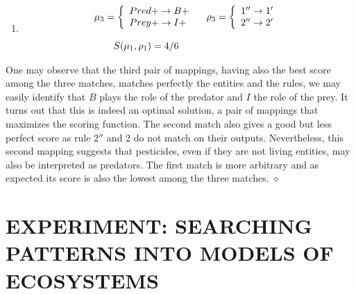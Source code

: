 \documentclass[a4paper,twoside]{article}
\begin{document}
\begin{example}
\begin{enumerate}
\item $$\begin{array}{l@{\hspace{3mm}}l@{\hspace{3mm}}}
	\mapcomp_3=\left\{
		\begin{array}{l}
					Pred+ \to B+ \\
                    Prey+ \to I+ \\
				\end{array}\right.
                    &
     ~\maprule_3=\left\{
                \begin{array}{l}
                   1'' \to 1' \\
				   2'' \to 2' \\
					\end{array}\right. 
                    \\ \\
   \qquad                 \gf(\mapcomp_1,\maprule_1)=4/6
\end{array}$$
%

\end{enumerate}

One may observe that the third pair of mappings, having also the best score among the three matches, matches perfectly the entities and the rules, \ie we may easily identify that $B$ plays the role of the predator and $I$ the role of the prey.
It turns out that this is indeed an optimal solution, \ie a pair of mappings that maximizes the scoring function.
%
The second match also gives a good but less perfect score as
rule $2''$ and $2$ do not match on their outputs. Nevertheless, this second mapping suggests that pesticides, even if they are not living entities, may also be interpreted as predators. 
%
%
The first match is more arbitrary and as expected its score is also the lowest among the three matches.
\hfill $\diamond$
\end{example}




\section{\uppercase{Experiment: searching patterns into models of ecosystems}}
\label{sec:experiments}
\end{document}
